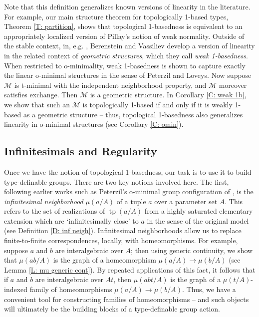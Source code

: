 \documentclass{amsart}
\theoremstyle{definition}
\newcommand{\tp}{\operatorname{tp}}
\begin{document}
Note that this definition generalizes known versions of linearity in the literature. For example, our main structure theorem for topologically 1-based types, Theorem \ref{T: partition}, shows that topological 1-basedness is equivalent to an appropriately localized version of Pillay's notion of weak normality. Outside of the stable context, in, e.g.  \cite{BerVas}, Berenstein and Vassiliev develop a version of linearity in the related context of \textit{geometric structures}, which they call \textit{weak 1-basedness}. When restricted to o-minimality, weak 1-basedness is shown to capture exactly the linear o-minimal structures in the sense of Peterzil and Loveys. Now suppose $\mathcal M$ is t-minimal with the independent neighborhood property, and $\mathcal M$ moreover satisfies exchange. Then $\mathcal M$ is a geometric structure. In Corollary \ref{C: weak 1b}, we show that such an $\mathcal M$ is topologically 1-based if and only if it is weakly 1-based as a geometric structure -- thus, topological 1-basedness also generalizes linearity in o-minimal structures (see Corollary \ref{C: omin}).

\subsection{Infinitesimals and Regularity} Once we have the notion of topological 1-basedness, our task is to use it to build type-definable groups. There are two key notions involved here. The first, following earlier works such as Peterzil's o-minimal group configuration of \cite{PetGconf}, is the \textit{infinitesimal neighborhood} $\mu(a/A)$ of a tuple $a$ over a parameter set $A$. This refers to the set of realizations of $\tp(a/A)$ from a highly saturated elementary extension which are `infinitesimally close' to $a$ in the sense of the original model (see Definition \ref{D: inf neigh}). Infinitesimal neighborhoods allow us to replace finite-to-finite correspondences, locally, with homeomorphisms. For example, suppose $a$ and $b$ are interalgebraic over $A$; then using generic continuity, we show that $\mu(ab/A)$ is the graph of a homeomorphism $\mu(a/A)\rightarrow\mu(b/A)$ (see Lemma \ref{L: mu generic cont}). By repeated applications of this fact, it follows that if $a$ and $b$ are interalgebraic over $At$, then $\mu(abt/A)$ is the graph of a $\mu(t/A)$-indexed family of homeomorphisms $\mu(a/A)\rightarrow\mu(b/A)$. Thus, we have a convenient tool for constructing families of homeomorphisms -- and such objects will ultimately be the building blocks of a type-definable group action.
\end{document}
